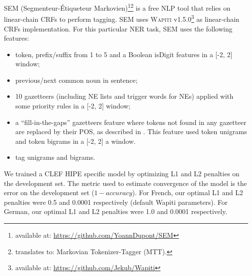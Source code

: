 SEM (Segmenteur-Étiqueteur Markovien)\footnote{available at: \url{https://github.com/YoannDupont/SEM}}\footnote{translates to: Markovian Tokenizer-Tagger (MTT).} \citep{dupont-2017-exploration} is a free NLP tool that relies on linear-chain CRFs \citep{lafferty-etal-2001-conditional} to perform tagging. SEM uses \textsc{Wapiti} \citep{lavergne-etal-2010-practical} v1.5.0\footnote{available at: \url{https://github.com/Jekub/Wapiti}} as linear-chain CRFs implementation. For this particular NER task, SEM uses the following features:
\begin{itemize}
    \item token, prefix/suffix from 1 to 5 and a Boolean isDigit features in a [-2, 2] window; %
    \item previous/next common noun in sentence;
    \item 10 gazetteers (including NE lists and trigger words for NEs) applied with some priority rules in a [-2, 2] window;
    \item a ``fill-in-the-gaps'' gazetteers feature where tokens not found in any gazetteer are replaced by their POS, as described in \citet{raymond-fayolle-2010-reconnaissance}. This feature used token unigrams and token bigrams in a [-2, 2] a window.
    \item tag unigrams and bigrams.
\end{itemize}

We trained a CLEF HIPE specific model by optimizing L1 and L2 penalties on the development set. The metric used to estimate convergence of the model is the error on the development set ($1 - accuracy$). For French, our optimal L1 and L2 penalties were 0.5 and 0.0001 respectively (default Wapiti parameters). For German, our optimal L1 and L2 penalties were 1.0 and 0.0001 respectively.

